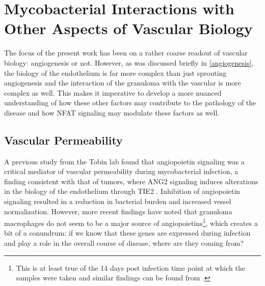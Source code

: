\citep{Shiau2015} %

\section{Mycobacterial Interactions with Other Aspects of Vascular Biology}

The focus of the present work has been on a rather coarse readout of vascular biology: angiogenesis or not. However, as was discussed briefly in \autoref{angiogenesis}, the biology of the endothelium is far more complex than just sprouting angiogenesis and the interaction of the granuloma with the vascular is more complex as well. This makes it imperative to develop a more nuanced understanding of how these other factors may contribute to the pathology of the disease and how NFAT signaling may modulate these factors as well. 

\subsection{Vascular Permeability}

\citep{Akwii2021, Augustin2009, Huang2010, ParkWindhol2016, Saharinen2017, Thurston2012}

A previous study from the Tobin lab found that angiopoietin signaling was a critical mediator of vascular permeability during mycobacterial infection, a finding consistent with that of tumors, where ANG2 signaling induces alterations in the biology of the endothelium through TIE2 \citep{Oehlers2017, Duran2021, Goel2012}. Inhibition of angiopoietin signaling resulted in a reduction in bacterial burden and increased vessel normalization. However, more recent findings have noted that granuloma macrophages do not seem to be a major source of angiopoietins\footnote{This is at least true of the 14 days post infection time point at which the samples were taken and similar findings can be found from \citep{Gideon2022}.}, which creates a bit of a conundrum: if we know that these genes are expressed during infection and play a role in the overall course of disease, where are they coming from? \citep{Cronan2021} 

